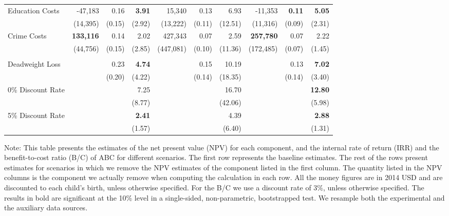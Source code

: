 \begin{table}
\begin{threeparttable}
\begin{tabular}{l r r r r r r r r r}
Education Costs	&	-47,183	&	0.16	&	\textbf{3.91}	&	15,340	&	0.13	&	6.93	&	-11,353	&	\textbf{0.11}	&	\textbf{5.05}	\\
	&	(14,395)	&	(0.15)	&	(2.92)	&	(13,222)	&	(0.11)	&	(12.51)	&	(11,316)	&	(0.09)	&	(2.31)	\\
Crime Costs	&	\textbf{133,116}	&	0.14	&	2.02	&	427,343	&	0.07	&	2.59	&	\textbf{257,780}	&	0.07	&	2.22	\\
	&	(44,756)	&	(0.15)	&	(2.85)	&	(447,081)	&	(0.10)	&	(11.36)	&	(172,485)	&	(0.07)	&	(1.45)	\\\\
Deadweight Loss	&		&	0.23	&	\textbf{4.74}	&		&	0.15	&	10.19	&		&	0.13	&	\textbf{7.02}	\\
	&		&	(0.20)	&	(4.22)	&		&	(0.14)	&	(18.35)	&		&	(0.14)	&	(3.40)	\\
0\% Discount Rate	&		&		&	7.25	&		&		&	16.70	&		&		&	\textbf{12.80}	\\
	&		&		&	(8.77)	&		&		&	(42.06)	&		&		&	(5.98)	\\
5\% Discount Rate	&		&		&	\textbf{2.41}	&		&		&	4.39	&		&		&	\textbf{2.88}	\\
	&		&		&	(1.57)	&		&		&	(6.40)	&		&		&	(1.31)	\\
\bottomrule
\end{tabular}
\begin{tablenotes}
\item Note: This table presents the estimates of the net present value (NPV) for each component, and the internal rate of return (IRR) and the benefit-to-cost ratio (B/C) of ABC for different scenarios. The first row represents the baseline estimates. The rest of the rows present estimates for scenarios in which we remove the NPV estimates of the component listed in the first column. The quantity listed in the NPV columns is the component we actually remove when computing the calculation in each row. All the money figures are in 2014 USD and are discounted to each child's birth, unless otherwise specified. For the B/C we use a discount rate of $3\%$, unless otherwise specified. The results in bold are significant at the 10\% level in a single-sided, non-parametric, bootstrapped test. We resample both the experimental and the auxiliary data sources. 
\end{tablenotes}
\end{threeparttable}
\end{table}

